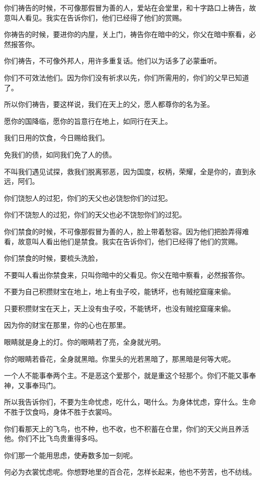 \documentclass[12pt,oneside]{book}
\begin{document}
你们祷告的时候，不可像那假冒为善的人，爱站在会堂里，和十字路口上祷告，故意叫人看见。我实在告诉你们，他们已经得了他们的赏赐。

你祷告的时候，要进你的内屋，关上门，祷告你在暗中的父，你父在暗中察看，必然报答你。

你们祷告，不可像外邦人，用许多重复话。他们以为话多了必蒙垂听。

你们不可效法他们。因为你们没有祈求以先，你们所需用的，你们的父早已知道了。

所以你们祷告，要这样说，我们在天上的父，愿人都尊你的名为圣。

愿你的国降临，愿你的旨意行在地上，如同行在天上。

我们日用的饮食，今日赐给我们。

免我们的债，如同我们免了人的债。

不叫我们遇见试探，救我们脱离邪恶，因为国度，权柄，荣耀，全是你的，直到永远，阿们。

你们饶恕人的过犯，你们的天父也必饶恕你们的过犯。

你们不饶恕人的过犯，你们的天父也必不饶恕你们的过犯。

你们禁食的时候，不可像那假冒为善的人，脸上带着愁容。因为他们把脸弄得难看，故意叫人看出他们是禁食。我实在告诉你们，他们已经得了他们的赏赐。

你们禁食的时候，要梳头洗脸，

不要叫人看出你禁食来，只叫你暗中的父看见。你父在暗中察看，必然报答你。

不要为自己积攒财宝在地上，地上有虫子咬，能锈坏，也有贼挖窟窿来偷。

只要积攒财宝在天上，天上没有虫子咬，不能锈坏，也没有贼挖窟窿来偷。

因为你的财宝在那里，你的心也在那里。

眼睛就是身上的灯。你的眼睛若了亮，全身就光明。

你的眼睛若昏花，全身就黑暗。你里头的光若黑暗了，那黑暗是何等大呢。

一个人不能事奉两个主。不是恶这个爱那个，就是重这个轻那个。你们不能又事奉神，又事奉玛门。

所以我告诉你们，不要为生命忧虑，吃什么，喝什么。为身体忧虑，穿什么。生命不胜于饮食吗，身体不胜于衣裳吗。

你们看那天上的飞鸟，也不种，也不收，也不积蓄在仓里，你们的天父尚且养活他。你们不比飞鸟贵重得多吗。

你们那一个能用思虑，使寿数多加一刻呢。

何必为衣裳忧虑呢。你想野地里的百合花，怎样长起来，他也不劳苦，也不纺线。
\end{document}
